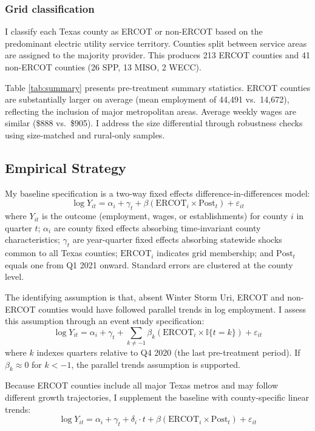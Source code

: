 \documentclass[12pt]{article}
\newcommand{\ind}{\mathbb{I}}
\begin{document}
\subsubsection*{Grid classification} I classify each Texas county as ERCOT or non-ERCOT based on the predominant electric utility service territory. Counties split between service areas are assigned to the majority provider. This produces 213 ERCOT counties and 41 non-ERCOT counties (26 SPP, 13 MISO, 2 WECC).

Table \ref{tab:summary} presents pre-treatment summary statistics. ERCOT counties are substantially larger on average (mean employment of 44,491 vs.\ 14,672), reflecting the inclusion of major metropolitan areas. Average weekly wages are similar (\$888 vs.\ \$905). I address the size differential through robustness checks using size-matched and rural-only samples.

\subsection{Empirical Strategy}

My baseline specification is a two-way fixed effects difference-in-differences model:
\begin{equation}
\log Y_{it} = \alpha_i + \gamma_t + \beta(\text{ERCOT}_i \times \text{Post}_t) + \varepsilon_{it}
\label{eq:did}
\end{equation}
where $Y_{it}$ is the outcome (employment, wages, or establishments) for county $i$ in quarter $t$; $\alpha_i$ are county fixed effects absorbing time-invariant county characteristics; $\gamma_t$ are year-quarter fixed effects absorbing statewide shocks common to all Texas counties; $\text{ERCOT}_i$ indicates grid membership; and $\text{Post}_t$ equals one from Q1 2021 onward. Standard errors are clustered at the county level.

The identifying assumption is that, absent Winter Storm Uri, ERCOT and non-ERCOT counties would have followed parallel trends in log employment. I assess this assumption through an event study specification:
\begin{equation}
\log Y_{it} = \alpha_i + \gamma_t + \sum_{k \neq -1} \beta_k (\text{ERCOT}_i \times \ind\{t = k\}) + \varepsilon_{it}
\label{eq:es}
\end{equation}
where $k$ indexes quarters relative to Q4 2020 (the last pre-treatment period). If $\beta_k \approx 0$ for $k < -1$, the parallel trends assumption is supported.

Because ERCOT counties include all major Texas metros and may follow different growth trajectories, I supplement the baseline with county-specific linear trends:
\begin{equation}
\log Y_{it} = \alpha_i + \gamma_t + \delta_i \cdot t + \beta(\text{ERCOT}_i \times \text{Post}_t) + \varepsilon_{it}
\label{eq:trend}
\end{equation}
\end{document}
